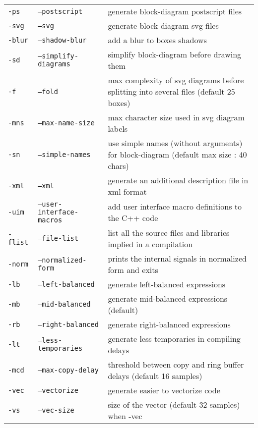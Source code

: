 \begin{supertabular}{|p{1.5cm}|p{4cm}|p{5cm}|}
\texttt{-ps} 				& \texttt{--postscript} 			& generate block-diagram postscript files  \\
\texttt{-svg} 				& \texttt{--svg} 					& generate block-diagram svg files  \\
\texttt{-blur} 				& \texttt{--shadow-blur} 			& add a blur to boxes shadows  \\
\texttt{-sd} 				& \texttt{--simplify-diagrams} 		& simplify block-diagram before drawing them  \\
\texttt{-f } 		& \texttt{--fold }  		& max complexity of svg diagrams before splitting into several files (default 25 boxes)  \\
\texttt{-mns } 		& \texttt{--max-name-size } & max character size used in svg diagram labels\\
\texttt{-sn}             	& \texttt{--simple-names}			& use simple names (without arguments) for block-diagram (default max size : 40 chars) \\
\texttt{-xml} 				& \texttt{--xml} 					& generate an additional description file in xml format  \\
\texttt{-uim} 				& \texttt{--user-interface-macros} 	& add user interface macro definitions to the C++ code  \\
\texttt{-flist} 			& \texttt{--file-list} 				& list all the source files and libraries implied in a compilation  \\
\texttt{-norm} 				& \texttt{--normalized-form} 		& prints the internal signals in normalized form and exits  \\
\hline
\texttt{-lb}	 			& \texttt{--left-balanced} 			& generate left-balanced expressions  \\
\texttt{-mb} 				& \texttt{--mid-balanced} 			& generate mid-balanced expressions (default)  \\
\texttt{-rb} 				& \texttt{--right-balanced}			& generate right-balanced expressions  \\
\texttt{-lt} 				& \texttt{--less-temporaries}		& generate less temporaries in compiling delays  \\
\texttt{-mcd }		& \texttt{--max-copy-delay }& threshold between copy and ring buffer delays (default 16 samples)\\
\hline
\texttt{-vec} 				& \texttt{--vectorize}				& generate easier to vectorize code  \\
\texttt{-vs }		& \texttt{--vec-size }		& size of the vector (default 32 samples) when -vec \\

\end{supertabular}
